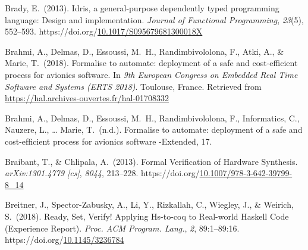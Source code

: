 \documentclass[12pt,twoside]{article}
\begin{document}
{\begin{thebibliography}{1079}
\mdbibitemlabel{}Brady, E.~(2013). Idris, a general-purpose dependently typed programming language: Design and implementation. \emph{Journal of Functional Programming}, \emph{23}(5), 552–593. https://doi.org/\href{https://dx.doi.org/10.1017/S095679681300018X}{10.1017/S095679681300018X}%

\mdbibitemlabel{}Brahmi, A., Delmas, D., Essoussi, M.~H., Randimbivololona, F., Atki, A., \& Marie, T.~(2018). Formalise to automate: deployment of a safe and cost-efficient process for avionics software. In \emph{9th European Congress on Embedded Real Time Software and Systems (ERTS 2018)}. Toulouse, France. Retrieved from \href{https://hal.archives-ouvertes.fr/hal-01708332}{{\ttfamily https://\hspace{0pt}hal.\hspace{0pt}archives-\hspace{0pt}ouvertes.\hspace{0pt}fr/\hspace{0pt}hal-\hspace{0pt}01708332}}%

\mdbibitemlabel{}Brahmi, A., Delmas, D., Essoussi, M.~H., Randimbivololona, F., Informatics, C., Nauzere, L., … Marie, T.~(n.d.). Formalise to automate: deployment of a safe and cost-efﬁcient process for avionics software -Extended, 17.%

\mdbibitemlabel{}Braibant, T., \& Chlipala, A.~(2013). Formal Verification of Hardware Synthesis. \emph{arXiv:1301.4779 {}[cs]}, \emph{8044}, 213–228. https://doi.org/\href{https://dx.doi.org/10.1007/978-3-642-39799-8_14}{10.1007/978-3-642-39799-8\_14}%

\mdbibitemlabel{}Breitner, J., Spector-Zabusky, A., Li, Y., Rizkallah, C., Wiegley, J., \& Weirich, S.~(2018). Ready, Set, Verify! Applying Hs-to-coq to Real-world Haskell Code (Experience Report). \emph{Proc. ACM Program. Lang.}, \emph{2}, 89:1–89:16. https://doi.org/\href{https://dx.doi.org/10.1145/3236784}{10.1145/3236784}%


\end{thebibliography}}
\end{document}

